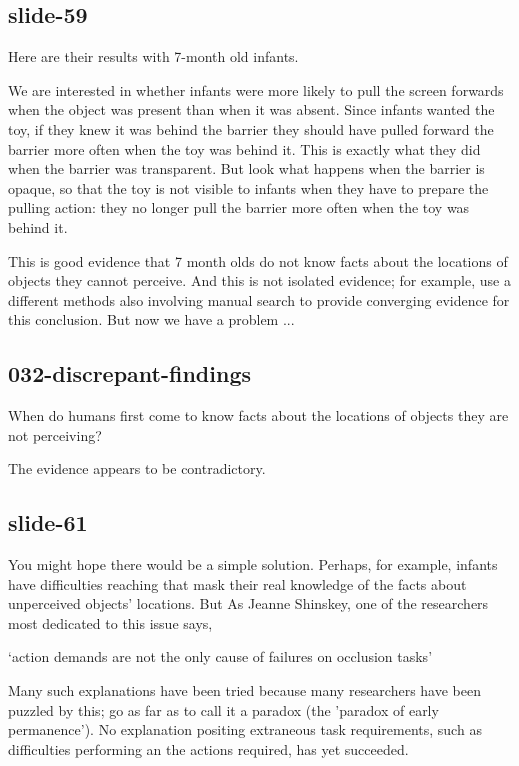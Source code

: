 \documentclass[12pt,\papersize]{extarticle}
\begin{document}
 
 
\subsection{slide-59}
Here are their results with 7-month old infants.
 
We are interested in whether infants were more likely to pull the screen forwards when the object was present than when it was absent. Since infants wanted the toy, if they knew it was behind the barrier they should have pulled forward the barrier more often when the toy was behind it. This is exactly what they did when the barrier was transparent. But look what happens when the barrier is opaque, so that the toy is not visible to infants when they have to prepare the pulling action: they no longer pull the barrier more often when the toy was behind it.
 
This is good evidence that 7 month olds do not know facts about the locations of objects they cannot perceive. And this is not isolated evidence; for example, \citet{moore:2008_factors} use a different methods also involving manual search to provide converging evidence for this conclusion. But now we have a problem ...
 
 
 
\subsection{032-discrepant-findings}
When do humans first come to know facts about the locations of objects they are not perceiving?
 
The evidence appears to be contradictory.
 
 
 
\subsection{slide-61}
You might hope there would be a simple solution. Perhaps, for example, infants have difficulties reaching that mask their real knowledge of the facts about unperceived objects' locations. But As Jeanne Shinskey, one of the researchers most dedicated to this issue says,
 
‘action demands are not the only cause of failures on occlusion tasks’
\citep[p.\ 291]{shinskey:2012_disappearing}
 
Many such explanations have been tried because many researchers have been puzzled by this; \citet{Meltzoff:1998wp} go as far as to call it a paradox (the 'paradox of early permanence'). No explanation positing extraneous task requirements, such as difficulties performing an the actions required, has yet succeeded.
 
\end{document}
